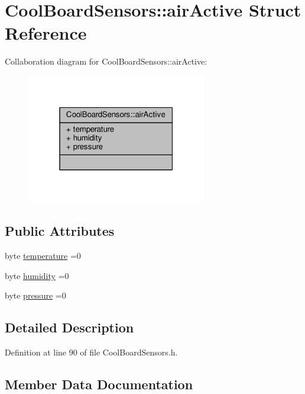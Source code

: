\hypertarget{structCoolBoardSensors_1_1airActive}{}\section{Cool\+Board\+Sensors\+:\+:air\+Active Struct Reference}
\label{structCoolBoardSensors_1_1airActive}


Collaboration diagram for Cool\+Board\+Sensors\+:\+:air\+Active\+:
\nopagebreak
\begin{figure}[H]
\begin{center}
\leavevmode
\includegraphics[width=223pt]{structCoolBoardSensors_1_1airActive__coll__graph}
\end{center}
\end{figure}
\subsection*{Public Attributes}
\begin{DoxyCompactItemize}
\item 
byte \hyperlink{structCoolBoardSensors_1_1airActive_a9a6633c426b0508e30ebc1832ec6d745}{temperature} =0
\item 
byte \hyperlink{structCoolBoardSensors_1_1airActive_ae5740445054b27415e22f450576accb7}{humidity} =0
\item 
byte \hyperlink{structCoolBoardSensors_1_1airActive_ab200826a70d1dc9945f5efb6b9c732ed}{pressure} =0
\end{DoxyCompactItemize}


\subsection{Detailed Description}


Definition at line 90 of file Cool\+Board\+Sensors.\+h.



\subsection{Member Data Documentation}
\mbox{\label{structCoolBoardSensors_1_1airActive_ae5740445054b27415e22f450576accb7}} 
